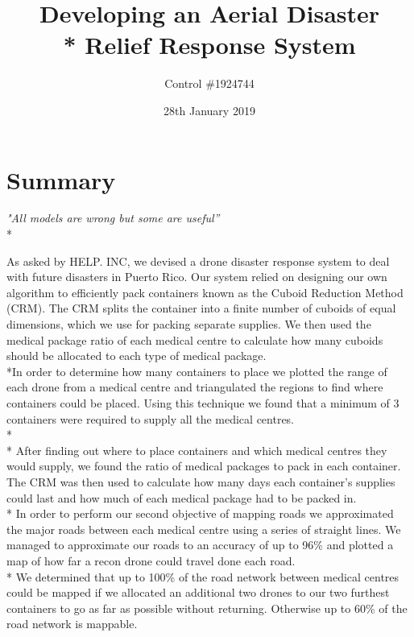 \documentclass[a4paper,12pt]{article}
\begin{document}
\title{Developing an Aerial Disaster \\* Relief Response System}
\author{Control \#1924744}
\date{28th January 2019}
\maketitle
\newpage


\pagestyle{style2}

\section*{\hfil Summary\hfil}
\begin{center}
\textit{"All models are wrong but some are useful''} \\*
\end{center}
As asked by HELP. INC, we devised a drone disaster response system to deal with future disasters in Puerto Rico.
Our system relied on designing our own algorithm to efficiently pack containers known as the Cuboid Reduction Method (CRM).
The CRM splits the container into a finite number of cuboids of equal dimensions, which we use for packing separate supplies.
We then used the medical package ratio of each medical centre to calculate how many cuboids should be allocated to each type of medical package.
\\*In order to determine how many containers to place we plotted the range of each drone from a medical centre and triangulated the regions to find where containers could be placed.
Using this technique we found that a minimum of 3 containers were required to supply all the medical centres. \\*\\*
After finding out where to place containers and which medical centres they would supply, we found the ratio of medical packages to pack in each container.
The CRM was then used to calculate how many days each container's supplies could last and how much of each medical package had to be packed in.
\\*
In order to perform our second objective of mapping roads we approximated the major roads between each medical centre using a series of straight lines.
We managed to approximate our roads to an accuracy of up to 96\% and plotted a map of how far a recon drone could travel done each road.\\* We determined that up to 100\% of the road network between medical centres
could be mapped if we allocated an additional two drones to our two furthest containers to go as far as possible without returning. Otherwise up to 60\% of the road network is mappable.
\end{document}
